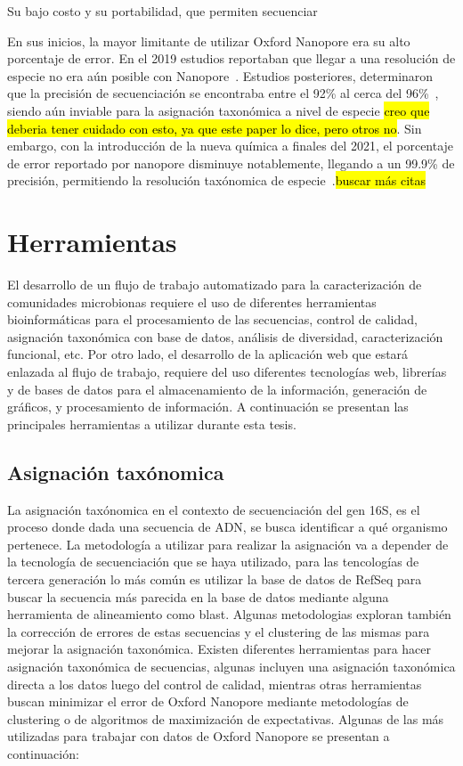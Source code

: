 Su bajo costo y su portabilidad, que permiten secuenciar 

En sus inicios, la mayor limitante de utilizar Oxford Nanopore era su alto porcentaje de error. En el 2019 estudios reportaban que llegar a una resolución de especie no era aún posible con Nanopore~\cite{winand2019targeting}. Estudios posteriores, determinaron que la precisión de secuenciación se encontraba entre el 92\% al cerca del 96\%~\cite{urban2021freshwater,delahaye2021sequencing}, siendo aún inviable para la asignación taxonómica a nivel de especie \hl{creo que deberia tener cuidado con esto, ya que este paper lo dice, pero otros no}. Sin embargo, con la introducción de la nueva química a finales del 2021, el porcentaje de error reportado por nanopore disminuye notablemente, llegando a un 99.9\% de precisión, permitiendo la resolución taxónomica de especie~\cite{yoon2017introducing}.\hl{buscar más citas}


\section{Herramientas}
El desarrollo de un flujo de trabajo automatizado para la caracterización de comunidades microbionas requiere el uso de diferentes herramientas bioinformáticas para el procesamiento de las secuencias, control de calidad, asignación taxonómica con base de datos, análisis de diversidad, caracterización funcional, etc. Por otro lado, el desarrollo de la aplicación web que estará enlazada al flujo de trabajo, requiere del uso diferentes tecnologías web, librerías y de bases de datos para el almacenamiento de la información, generación de gráficos, y procesamiento de información. A continuación se presentan las principales herramientas a utilizar durante esta tesis.
\subsection{Asignación taxónomica}
La asignación taxónomica en el contexto de secuenciación del gen 16S, es el proceso donde dada una secuencia de ADN, se busca identificar a qué organismo pertenece.
La metodología a utilizar para realizar la asignación va a depender de la tecnología de secuenciación que se haya utilizado,%
para las tencologías de tercera generación lo más común es utilizar la base de datos de RefSeq para buscar la secuencia más parecida en la base de datos mediante alguna herramienta de alineamiento como blast. Algunas metodologias exploran también la corrección de errores de estas secuencias y el clustering de las mismas para mejorar la asignación taxonómica. 
Existen diferentes herramientas para hacer asignación taxonómica de secuencias, algunas incluyen una asignación taxonómica directa a los datos luego del control de calidad, mientras otras herramientas buscan minimizar el error de Oxford Nanopore mediante metodologías de clustering o de algoritmos de maximización de expectativas. 
Algunas de las más utilizadas para trabajar con datos de Oxford Nanopore se presentan a continuación:

